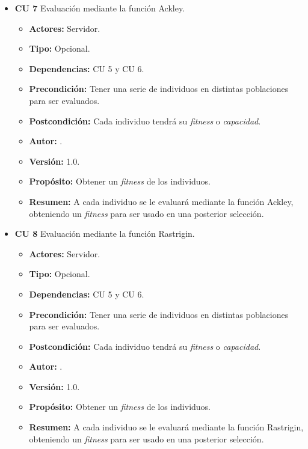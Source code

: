\begin{itemize}
	\item \textbf{CU 7} Evaluación mediante la función Ackley.
	\begin{itemize}
		\item \textbf{Actores:} Servidor.
		\item \textbf{Tipo:} Opcional.
		\item \textbf{Dependencias:} CU 5 y CU 6.
		\item \textbf{Precondición:} Tener una serie de individuos en distintas poblaciones para ser evaluados.
		\item \textbf{Postcondición:} Cada individuo tendrá su \textit{fitness} o \textit{capacidad}.
		\item\textbf{ Autor:} {\autor}.
		\item \textbf{Versión:} 1.0.
		\item \textbf{Propósito:} Obtener un \textit{fitness} de los individuos.
		\item \textbf{Resumen:} A cada individuo se le evaluará mediante la función Ackley, obteniendo un \textit{fitness} para ser usado en una posterior selección.
	\end{itemize}	

	\item \textbf{CU 8} Evaluación mediante la función Rastrigin.
	\begin{itemize}
		\item \textbf{Actores:} Servidor.
		\item \textbf{Tipo:} Opcional.
		\item \textbf{Dependencias:} CU 5 y CU 6.
		\item \textbf{Precondición:} Tener una serie de individuos en distintas poblaciones para ser evaluados.
		\item \textbf{Postcondición:} Cada individuo tendrá su \textit{fitness} o \textit{capacidad}.
		\item\textbf{ Autor:} {\autor}.
		\item \textbf{Versión:} 1.0.
		\item \textbf{Propósito:} Obtener un \textit{fitness} de los individuos.
		\item \textbf{Resumen:} A cada individuo se le evaluará mediante la función Rastrigin, obteniendo un \textit{fitness} para ser usado en una posterior selección.
	\end{itemize}	


\end{itemize}
